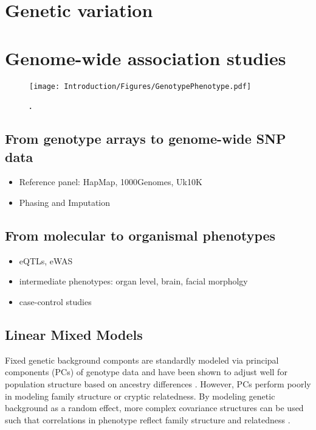 \section{Genetic variation}
\section{Genome-wide association studies}
\begin{figure}[hbtp]
	\centering
	\texttt{[image: Introduction/Figures/GenotypePhenotype.pdf]}
	\caption[\textbf{.}]{\textbf{.} } 
	 	\label{fig:GenoPheno}
\end{figure}

\subsection{From genotype arrays to genome-wide SNP data}
\begin{itemize}
	\item Reference panel: HapMap, 1000Genomes, Uk10K
	\item Phasing and Imputation
\end{itemize}

\subsection{From molecular to organismal phenotypes}
\begin{itemize}
	\item eQTLs, eWAS
	\item intermediate phenotypes: organ level, brain, facial morpholgy
	\item case-control studies
\end{itemize}

\subsection{Linear Mixed Models}

Fixed genetic background componts are standardly modeled via principal components (PCs) of genotype data \citep{Price2006} and have been shown to adjust well for population structure based on ancestry differences \citep{Patterson2006}. However, PCs perform poorly in modeling family structure or cryptic relatedness.  By modeling genetic background as a random effect, more complex covariance structures can be used such that correlations in phenotype reflect family structure and relatedness \citep{Yu2006,Kang2008}.
	
